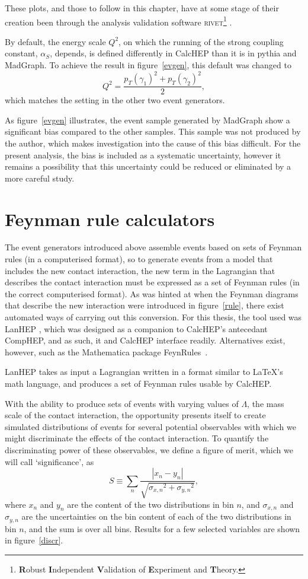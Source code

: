 These plots, and those to follow in this chapter, have at some stage of their creation been through the analysis validation software \textsc{rivet}\footnote{\textbf{R}obust \textbf{I}ndependent \textbf{V}alidation of \textbf{E}xperiment and \textbf{T}heory.} \cite{rivet}.

By default, the energy scale $Q^2$, on which the running of the strong coupling constant, $\alpha_S$, depends, is defined differently in CalcHEP than it is in pythia and MadGraph. To achieve the result in figure~\ref{evgen}, this default was changed to 
\[Q^2=\frac{p_T(\gamma_1)^2+p_T(\gamma_2)^2}{2},\]
which matches the setting in the other two event generators.

As figure~\ref{evgen} illustrates, the event sample generated by MadGraph show a significant bias compared to the other samples. This sample was not produced by the author, which makes investigation into the cause of this bias difficult. For the present analysis, the bias is included as a systematic uncertainty, however it remains a possibility that this uncertainty could be reduced or eliminated by a more careful study.


\section{Feynman rule calculators}
The event generators introduced above assemble events based on sets of Feynman rules (in a computerised format), so to generate events from a model that includes the new contact interaction, the new term in the Lagrangian that describes the contact interaction must be expressed as a set of Feynman rules (in the correct computerised format). As was hinted at when the Feynman diagrams that describe the new interaction were introduced in figure~\ref{rule}, there exist automated ways of carrying out this conversion. For this thesis, the tool used was LanHEP \cite{lanhep}, which was designed as a companion to CalcHEP's antecedant CompHEP, and as such, it and CalcHEP interface readily. Alternatives exist, however, such as the Mathematica package FeynRules~\cite{feynrules}. 

LanHEP takes as input a Lagrangian written in a format similar to \LaTeX's math language, and produces a set of Feynman rules usable by CalcHEP.

With the ability to produce sets of events with varying values of $\Lambda$, the mass scale of the contact interaction, the opportunity presents itself to create simulated distributions of events for several potential observables with which we might discriminate the effects of the contact interaction. To quantify the discriminating power of these observables, we define a figure of merit, which we will call `significance', as
\[S\equiv\sum_n \frac{|x_n-y_n|}{\sqrt{{\sigma_{x,n}}^2+{\sigma_{y,n}}^2}},\]
where $x_n$ and $y_n$ are the content of the two distributions in bin $n$, and $\sigma_{x,n}$ and $\sigma_{y,n}$ are the uncertainties on the bin content of each of the two distributions in bin $n$, and the sum is over all bins.
Results for a few selected variables are shown in figure~\ref{discr}.

